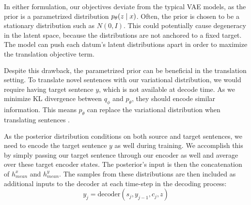 

In either formulation, our objectives deviate from the typical VAE models, as the prior is a parametrized distribution $p_{\theta}(z \; | \;{x})$. Often, the prior is chosen to be a stationary distribution such as $N(0, I)$. This could potentially cause degeneracy in the latent space, because the distributions are not anchored to a fixed target. The model can push each datum's latent distributions apart in order to maximize the translation objective term. %

Despite this drawback, the parametrized prior can be beneficial in the translation setting. To translate novel sentences with our variational distribution, we would require having target sentence $y$, which is not available at decode time. As we minimize KL divergence between $q_{\phi}$ and $p_{\theta}$, they should encode similar information. This means $p_{\theta}$ can replace the variational distribution when translating sentences \cite{Zhang2016VNMT}. %

As the  posterior distribution conditions on both source and target sentences, we need to encode the target sentence $y$ as well during training. We accomplish this by simply passing our target sentence through our encoder as well and average over these target encoder states. The posterior's input is then the concatenation of $h_{mean}^{x}$ and $h_{mean}^{y}$. The samples from these distributions are then included as additional inputs to the decoder at each time-step in the decoding process:
\begin{equation}
y_{j} = \text{decoder}(s_{j}, y_{j-1}, c_{j}, z)
\end{equation}



